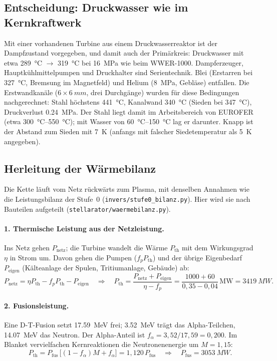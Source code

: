 \documentclass[10pt,a4paper]{article}
\begin{document}
\subsection{Entscheidung: Druckwasser wie im Kernkraftwerk}
Mit einer vorhandenen Turbine aus einem Druckwasserreaktor ist der Dampfzustand vorgegeben, und damit auch der
Primärkreis: Druckwasser mit etwa \SI{289}{\celsius} $\rightarrow$ \SI{319}{\celsius} bei \SI{16}{MPa} wie beim
WWER-1000. Dampferzeuger, Hauptkühlmittelpumpen und Druckhalter sind Serientechnik. Blei (Erstarren bei
\SI{327}{\celsius}, Bremsung im Magnetfeld) und Helium (\SI{8}{MPa}, Gebläse) entfallen. Die Erstwandkanäle
($6\times\SI{6}{mm}$, drei Durchgänge) wurden für diese Bedingungen nachgerechnet:
Stahl höchstens \SI{441}{\celsius}, Kanalwand \SI{340}{\celsius} (Sieden bei \SI{347}{\celsius}), Druckverlust
\SI{0,24}{MPa}. Der Stahl liegt damit im Arbeitsbereich von EUROFER (etwa \SIrange{300}{550}{\celsius}); mit
Wasser von \SIrange{60}{150}{\celsius} lag er darunter. Knapp ist der Abstand zum Sieden mit \SI{7}{K} (anfangs mit falscher Siedetemperatur als \SI{5}{K} angegeben).

\subsection{Herleitung der Wärmebilanz}
Die Kette läuft vom Netz rückwärts zum Plasma, mit denselben Annahmen wie die Leistungsbilanz der Stufe~0
(\texttt{invers/stufe0\_bilanz.py}). Hier wird sie nach Bauteilen aufgeteilt (\texttt{stellarator/waermebilanz.py}).

\paragraph{1. Thermische Leistung aus der Netzleistung.} Ins Netz gehen $P_\text{netz}$; die Turbine wandelt die
Wärme $P_\text{th}$ mit dem Wirkungsgrad $\eta$ in Strom um. Davon gehen die Pumpen ($f_p P_\text{th}$) und der
übrige Eigenbedarf $P_\text{eigen}$ (Kälteanlage der Spulen, Tritiumanlage, Gebäude) ab:
\[ P_\text{netz} = \eta P_\text{th} - f_p P_\text{th} - P_\text{eigen}
   \quad\Rightarrow\quad P_\text{th} = \frac{P_\text{netz} + P_\text{eigen}}{\eta - f_p}
   = \frac{1000 + 60}{0{,}35 - 0{,}04}\,\text{MW} = \SI{3419}{MW}. \]

\paragraph{2. Fusionsleistung.} Eine D-T-Fusion setzt \SI{17,59}{MeV} frei; \SI{3,52}{MeV} trägt das
Alpha-Teilchen, \SI{14,07}{MeV} das Neutron. Der Alpha-Anteil ist $f_\alpha = 3{,}52/17{,}59 = 0{,}200$. Im
Blanket vervielfachen Kernreaktionen die Neutronenenergie um $M = 1{,}15$:
\[ P_\text{th} = P_\text{fus}\,\bigl[(1-f_\alpha)M + f_\alpha\bigr] = 1{,}120\,P_\text{fus}
   \quad\Rightarrow\quad P_\text{fus} = \SI{3053}{MW}. \]
\end{document}
